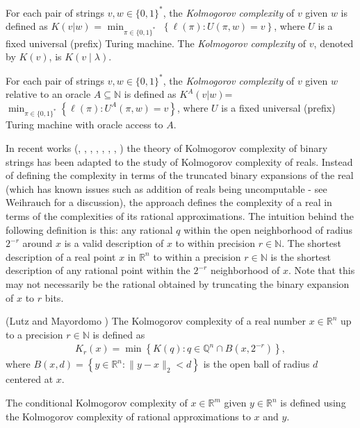\documentclass[a4paper,UKenglish,cleveref,autoref,thm-restate]{lipics-v2021}
\newcommand{\N}{\mathbb{N}}
\newcommand{\R}{\mathbb{R}}
\begin{document}
\begin{definition}
	For each pair of strings $v,w\in\{0,1\}^*$, the \emph{Kolmogorov
		complexity} of $v$ given $w$ is defined as $K\left(v|w\right)$ =
	$\min_{\pi\in\{0,1\}^*}$
	$ \left\{\ell(\pi):U\left(\pi,w\right)=v\right\}$, where $U$ is a
	fixed universal (prefix) Turing machine. The \emph{Kolmogorov
		complexity} of $v$, denoted by $K(v)$, is $K(v\mid \lambda)$.
\end{definition}
\begin{definition} 
	For each pair of strings $v,w\in\{0,1\}^*$, the \emph{Kolmogorov complexity} of $v$ given $w$ relative to an oracle $A\subseteq\mathbb{N}$ is defined as $K^A\left(v|w\right)$=$\min_{\pi\in\{0,1\}^*}\left\{\ell(\pi):U^A\left(\pi,w\right)=v\right\}$, where $U$ is a fixed universal (prefix) Turing machine with oracle access to $A$. 
\end{definition}
In recent works (\cite{Lutz2008a}, \cite{Lutz2008c}, \cite{Turetsky2011}, \cite{Lutz2018}, \cite{Lutz2018c}, \cite{Stull2020}, \cite{Stull2022}, \cite{Lutz2023a}) the theory of Kolmogorov complexity of binary strings has been adapted to the study of Kolmogorov complexity of reals. Instead of defining the complexity in terms of the truncated binary expansions of the real (which has known issues such as addition of reals being uncomputable - see Weihrauch \cite{Weihrauch2000} for a discussion), the approach defines the complexity of a real in terms of the complexities of its rational approximations. The intuition behind the following definition is this: any rational $q$ within the open neighborhood of radius $2^{-r}$ around $x$ is a valid description of $x$ to within precision $r\in\N$. The shortest description of a real point $x$ in $\R^n$ to within a precision $r\in\mathbb{N}$ is the shortest description of any rational point within the $2^{-r}$ neighborhood of $x$. Note that this may not necessarily be the rational obtained by truncating the binary expansion of $x$ to $r$ bits. 

\begin{definition}(Lutz and Mayordomo
  \cite{Lutz2008a}) 
  The Kolmogorov complexity of a real number $x\in\mathbb{R}^n$ up to
  a precision $r\in\mathbb{N}$ is defined as
\begin{align*}
K_r(x)=\min\left\{K(q):q\in\mathbb{Q}^n\cap B\left(x,2^{-r}\right)\right\},
\end{align*}
where $B(x,d)=\left\{y\in\mathbb{R}^n:\|y-x\|_2< d\right\}$ is the open ball of radius $d$ centered at $x$.
\end{definition}
The conditional Kolmogorov complexity of $x\in\R^m$ given $y\in\R^n$
is defined using the Kolmogorov complexity of rational approximations
to $x$ and $y$. 
\end{document}

